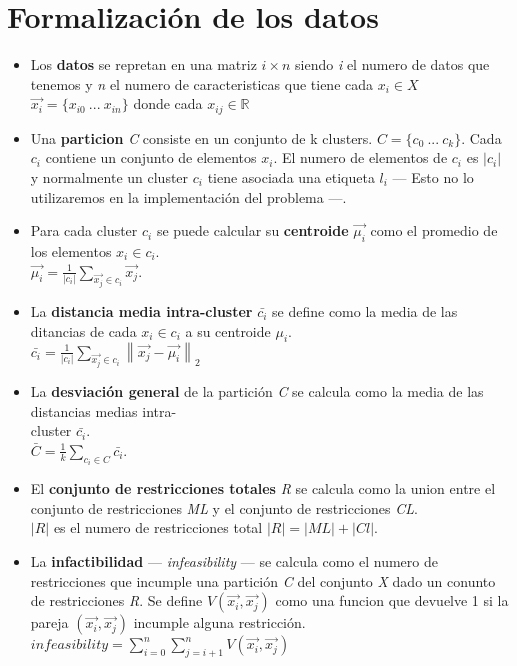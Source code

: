 \section{Formalización de los datos}
\begin{itemize}
   \item Los \textbf{datos} se repretan en una matriz $ i \times n $ siendo \emph{i} el numero de datos que tenemos y \emph{n} el numero de caracteristicas que tiene cada $ x_{i} \in X $ \\
   $ \vec{x_{i}} = \{x_{i0}\ ...\ x_{in}\} $ donde cada $ x_{ij} \in \mathbb{R} $
   \item Una \textbf{particion} \emph{C} consiste en un conjunto de k clusters. $ C = \{c_{0}\ ...\ c_{k}\} $. Cada $ c_{i} $ contiene un conjunto de elementos $ x_{i} $. El numero de elementos de $ c_{i} $ es $ \left | c_{i} \right | $ y normalmente un cluster $ c_{i} $ tiene asociada una etiqueta $ l_{i} $ --- Esto no lo utilizaremos en la implementación del problema ---.
   \item Para cada cluster $ c_{i} $ se puede calcular su \textbf{centroide} $ \vec{\mu_{i}} $ como el promedio de los elementos $ x_{i} \in c_{i} $.\\
   $ \vec{\mu_{i}} = \frac{1}{\left | c_{i} \right |}\sum_{\vec{x_{j}} \in c_{i}} \vec{x_{j}} $.
   \item La \textbf{distancia media intra-cluster} $ \bar{c_{i}} $ se define como la media de las ditancias de cada $ x_{i} \in c_{i} $ a su centroide $ \mu_{i} $.\\
   $ \bar{c_{i}} = \frac{1}{\left | c_{i} \right |}\sum_{\vec{x_{j}} \in c_{i}} \left \| \vec{x_{j}} - \vec{\mu_{i}} \right \|_{2} $
   \item La \textbf{desviación general} de la partición \emph{C} se calcula como la media de las distancias medias intra-\\cluster $ \bar{c_{i}} $.\\
   $ \bar{C} = \frac{1}{k}\sum_{c_{i} \in C} \bar{c_i} $.
   \item El \textbf{conjunto de restricciones totales} \emph{R} se calcula como la union entre el conjunto de restricciones \emph{ML} y el conjunto de restricciones \emph{CL}.\\
   $ \left | R \right | $ es el numero de restricciones total $ \left | R \right | = \left | ML \right | + \left | Cl \right | $.
   \item La \textbf{infactibilidad} --- \emph{infeasibility} --- se calcula como el numero de restricciones que incumple una partición \emph{C} del conjunto \emph{X} dado un conunto de restricciones \emph{R}. Se define $ V(\vec{x_{i}},\vec{x_{j}}) $ como una funcion que devuelve 1 si la pareja $ (\vec{x_{i}},\vec{x_{j}}) $ incumple alguna restricción.\\
   $ infeasibility = \sum_{i=0}^{n} \sum_{j=i+1}^{n} V(\vec{x_{i}},\vec{x_{j}}) $
\end{itemize}
\newpage
